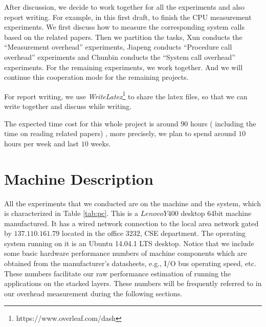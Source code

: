After discussion, we decide to work together for all the experiments and also report writing. For example, in this first draft, to finish the CPU measurement experiments. We first discuss how to measure the corresponding system calls based on the related papers. Then we partition the tasks, Xun conducts the ``Measurement overhead'' experiments, Jiapeng conducts ``Procedure call overhead'' experiments and Chunbin conducts the ``System call overhead'' experiments. For the remaining experiments, we work together. And we will continue this cooperation mode for the remaining projects.

For report writing, we use \textit{WriteLatex}\footnote{https://www.overleaf.com/dash} to share the latex files, so that we can write together and discuss while writing.

The expected time cost for this whole project is around $90$ hours ( including the time on reading related papers) , more precisely, we plan to spend around $10$ hours per week and last $10$ weeks.

\section{Machine Description}
\label{sec:pc}
All the experiments that we conducted are on the machine and the system, which is characterized in Table \ref{tab:pc}.
This is a $Lenovo Y400$ desktop 64bit machine manufactured. It has a wired network connection to the local area network gated by $137.110.161.79$ located in the office $3232$, CSE department. The operating system running on it is an Ubuntu 14.04.1 LTS desktop.
Notice that we include some basic hardware performance numbers of machine components which are obtained from the manufacturer's datasheets, e.g., I/O bus operating speed, etc. These numbers facilitate our raw performance estimation of running the applications on the stacked layers. These numbers will be frequently referred to in our overhead measurement during the following sections.


